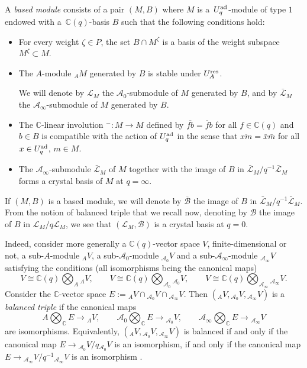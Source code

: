 \documentclass[10pt,a4paper]{amsart}
\numberwithin{equation}{section}
\theoremstyle{definition}
\newcommand{\mc}{\mathbb{C}}
\newcommand{\Ll}{{\mathcal L}}
\newcommand{\ra}{\rightarrow}
\begin{document}
 A {\it based module} consists of a pair $(M,B)$ where $M$ is a~$U_q^{\rm ad}$-module of type $1$ endowed with a~$\mc(q)$-basis $B$ such that the following conditions hold:
\begin{itemize}\itemsep=0pt
\item[(i)] For every weight $\zeta\in P$, the set $B\cap M^{\zeta}$ is a basis of the weight subspace $M^{\zeta}\subset M$.
\item[(ii)] The $A$-module ${}_A M$ generated by $B$ is stable under $U_A^{\rm res}$.


We will denote by $\Ll_M$ the $\mathcal{A}_0$-submodule of $M$ generated by $B$, and by $\bar{\Ll}_M$ the $\mathcal{A}_\infty$-submodule of $M$ generated by $B$.


\item[(iii)] The $\mc$-linear involution ${}^-\colon M\ra M$ defined by $\overline{fb} = \overline{f}b$ for all $f\in \mc(q)$ and $b\in B$ is compatible with the action of $U_q^{\rm ad}$ in the sense that $\overline{xm} = \bar{x}\bar{m}$ for all $x\in U_q^{\rm ad}$, $m\in M$.
\item[(iv)] The $\mathcal{A}_\infty$-submodule $\bar{\Ll}_M$ of $M$ together with the image of $B$ in $\bar{\Ll}_M/q^{-1}\bar{\Ll}_M$ forms a crystal basis of $M$ at $q=\infty$.
\end{itemize}
If $(M,B)$ is a based module, we will denote by $\overline{\mathcal{B}}$ the image of $B$ in $\bar{\Ll}_M/q^{-1}\bar{\Ll}_M$. From the notion of balanced triple that we recall now, denoting by $\mathcal{B}$ the image of $B$ in $\Ll_M/q\Ll_M$, we see that $(\Ll_M,\mathcal{B})$ is a crystal basis at $q=0$.

Indeed, consider more generally a $\mc(q)$-vector space $V$, finite-dimensional or not, a sub-$A$-module ${}_AV$, a sub-$\mathcal{A}_0$-module ${}_{\mathcal{A}_0}V$ and a sub-$\mathcal{A}_\infty$-module ${}_{\mathcal{A}_\infty}V$ satisfying the conditions (all isomorphisms being the canonical maps)
\[V\cong \mc(q) \bigotimes_A {}_AV ,\qquad V\cong \mc(q) \bigotimes_{\mathcal{A}_0} {}_{\mathcal{A}_0}V ,\qquad V\cong \mc(q) \bigotimes_{\mathcal{A}_\infty} {}_{\mathcal{A}_\infty}V.\]
Consider the $\mc$-vector space $E := {}_AV \cap {}_{\mathcal{A}_0}V \cap {}_{\mathcal{A}_\infty}V$. Then $({}_AV, {}_{\mathcal{A}_0}V,{}_{\mathcal{A}_\infty}V)$ is a {\it balanced triple} \cite{Kashiwara1,Kashiwara2} if the canonical maps
\begin{equation}\label{condbalanced}
A \bigotimes_\mc E \ra {}_AV,\qquad \mathcal{A}_0 \bigotimes_\mc E \ra {}_{\mathcal{A}_0}V ,\qquad \mathcal{A}_\infty \bigotimes_\mc E \ra {}_{\mathcal{A}_\infty}V
\end{equation}
are isomorphisms. Equivalently, $({}_AV, {}_{\mathcal{A}_0}V,{}_{\mathcal{A}_\infty}V)$ is balanced if and only if the canonical map $E \ra {}_{\mathcal{A}_0}V/q{}_{\mathcal{A}_0}V$ is an isomorphism, if and only if the canonical map $E \ra {}_{\mathcal{A}_\infty}V/q^{-1}{}_{\mathcal{A}_\infty}V$ is an isomorphism \cite[Lemma 2.1.1]{Kashiwara2}.
\end{document}
